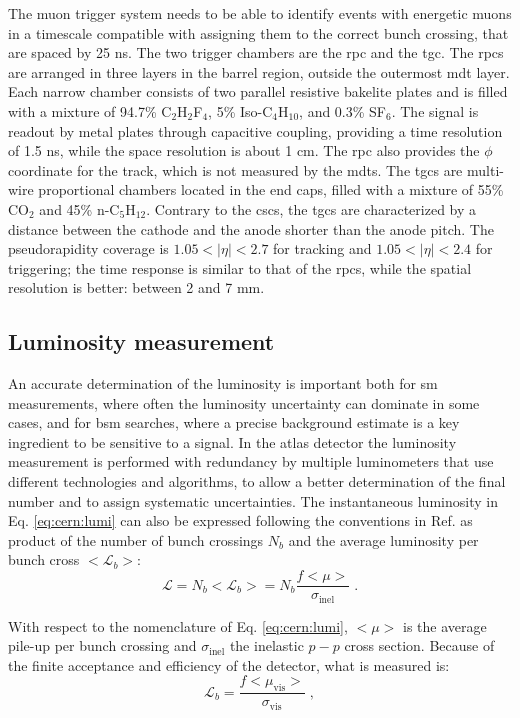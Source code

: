 The muon trigger system needs to be able to identify events with energetic muons in a timescale compatible with assigning them to the correct bunch crossing, that are spaced by 25 ns. The two trigger chambers are the \gls{rpc} and the \gls{tgc}. The \glspl{rpc} are arranged in three layers in the barrel region, outside the outermost \gls{mdt} layer. Each narrow chamber consists of two parallel resistive bakelite plates and is filled with a mixture of 94.7\% C$_2$H$_2$F$_4$, 5\% Iso-C$_4$H$_{10}$, and 0.3\% SF$_6$. The signal is readout by metal plates through capacitive coupling, providing a time resolution of 1.5 ns, while the space resolution is about 1 cm. The \gls{rpc} also provides the $\phi$ coordinate for the track, which is not measured by the \glspl{mdt}. The \glspl{tgc} are multi-wire proportional chambers located in the end caps, filled with a mixture of 55\% CO$_2$ and 45\% n-C$_5$H$_{12}$. Contrary to the \glspl{csc}, the \glspl{tgc} are characterized by a distance between the cathode and the anode shorter than the anode pitch. The pseudorapidity coverage is $1.05<|\eta|<2.7$ for tracking and $1.05<|\eta|<2.4$ for triggering; the time response is similar to that of the \glspl{rpc}, while the spatial resolution is better: between 2 and 7 mm. 

\subsection{Luminosity measurement}
\label{sec:lumimeas}

An accurate determination of the luminosity is important both for \gls{sm} measurements, where often the luminosity uncertainty can dominate in some cases, and for \gls{bsm} searches, where a precise background estimate is a key ingredient to be sensitive to a signal. In the \gls{atlas} detector the luminosity measurement is performed with redundancy by multiple luminometers that use different technologies and algorithms, to allow a better determination of the final number and to assign systematic uncertainties. The instantaneous luminosity in Eq. \ref{eq:cern:lumi} can also be expressed following the conventions in Ref. \cite{Aaboud:2016hhf} as product of the number of bunch crossings $N_b$ and the average luminosity per bunch cross $<\mathcal{L}_b>$:
\begin{equation}
\mathcal{L} = N_b <\mathcal{L}_b> = N_b \frac{f <\mu>}{\sigma_{\mathrm{inel}} } \; .
\label{eq:atlas:lumi}
\end{equation}

With respect to the nomenclature of Eq. \ref{eq:cern:lumi}, $<\mu>$ is the average pile-up per bunch crossing and $\sigma_{\mathrm{inel}}$ the inelastic $p-p$ cross section. Because of the finite acceptance and efficiency of the detector, what is measured is:
\begin{equation}
\mathcal{L}_b = \frac{f <\mu_\mathrm{vis}>}{\sigma_{\mathrm{vis}} } \; ,
\end{equation}

